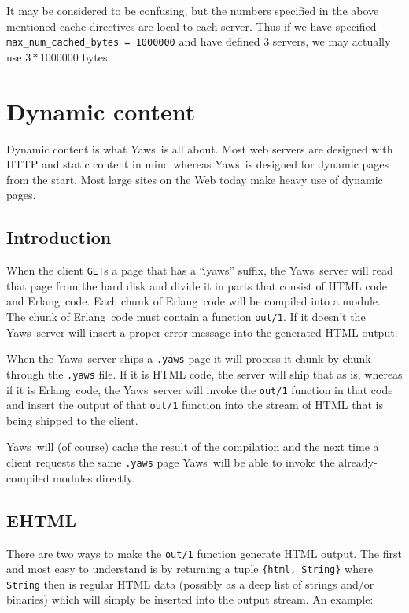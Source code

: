 \documentclass[11pt,oneside,english]{book}
\newcommand{\Erlang}            %
        {{\sc Erlang}}
\newcommand{\Yaws}            %
        {{\sc Yaws}}
\begin{document}
It may be considered to be confusing, but the numbers specified
in the above mentioned cache directives are local to each
server. Thus if we have specified \verb+max_num_cached_bytes = 1000000+
and have defined 3 servers, we may actually use $3 * 1000000$ bytes.




\chapter{Dynamic content}

Dynamic content is what \Yaws\ is all about. Most web servers are
designed with HTTP and static content in mind whereas \Yaws\ is
designed for dynamic pages from the start.  Most large sites on the
Web today make heavy use of dynamic pages.


\section{Introduction}

When the client \verb+GET+s a page that has a ``.yaws'' suffix, the
\Yaws\ server will read that page from the hard disk and divide it in
parts that consist of HTML code and \Erlang\ code. Each chunk of
\Erlang\ code will be compiled into a module. The chunk of
\Erlang\ code must contain a function \verb+out/1+. If it doesn't the
\Yaws\ server will insert a proper error message into the generated
HTML output.

When the \Yaws\ server ships a \verb+.yaws+ page it will process it
chunk by chunk through the \verb+.yaws+ file. If it is HTML code, the
server will ship that as is, whereas if it is \Erlang\ code, the
\Yaws\ server will invoke the \verb+out/1+ function in that code and
insert the output of that \verb+out/1+ function into the stream of
HTML that is being shipped to the client.

\Yaws\ will (of course) cache the result of the compilation and the
next time a client requests the same \verb+.yaws+ page \Yaws\ will be
able to invoke the already-compiled modules directly.


\section{EHTML}

There are two ways to make the \verb+out/1+ function generate HTML
output. The first and most easy to understand is by returning a tuple
\verb+{html, String}+ where \verb+String+ then is regular HTML data
(possibly as a deep list of strings and/or binaries) which will simply
be inserted into the output stream.
An example:
\end{document}
